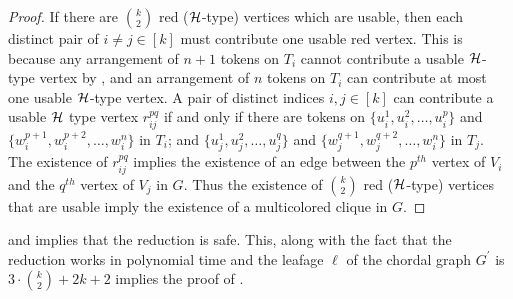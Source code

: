 \begin{proof}
If there are ${k}\choose{2}$ red (${\mathcal H}$-type) vertices which are usable,
then each distinct pair of $i\neq j\in [k]$ must contribute one
usable red vertex.
This is because any arrangement of $n+1$ tokens on $T_i$ cannot
contribute a usable ${\mathcal H}$-type vertex by ,
and an arrangement of $n$ tokens on $T_i$ can contribute at most one
usable ${\mathcal H}$-type vertex.
A pair of distinct indices $i,j\in [k]$ can contribute a usable
${\mathcal H}$ type vertex $r^{pq}_{ij}$ if and only if there are tokens
on $\{u_i^1,u_i^2,\ldots,u_i^{p}\}$ and
$\{w_i^{p+1},w_i^{p+2},\ldots,w_i^n\}$ in $T_i$;
and $\{u_j^1,u_j^2,\ldots,u_j^{q}\}$ and
$\{w_j^{q+1},w_j^{q+2},\ldots,w_i^n\}$ in $T_j$.
The existence of $r^{pq}_{ij}$ implies the existence of
an edge between the $p^{th}$ vertex of $V_i$ and
the $q^{th}$ vertex of $V_j$ in $G$.
Thus the existence of ${k}\choose{2}$ red (${\mathcal H}$-type)
vertices that are usable imply the existence of a 
multicolored clique in $G$.
\end{proof}

 and
implies that the reduction is safe.
This, along with the fact that the reduction works in polynomial time
and the leafage $\ell$ of the chordal graph $G^\prime$
is $3\cdot {{k}\choose{2}}+2k+2$
implies the 
proof of .
